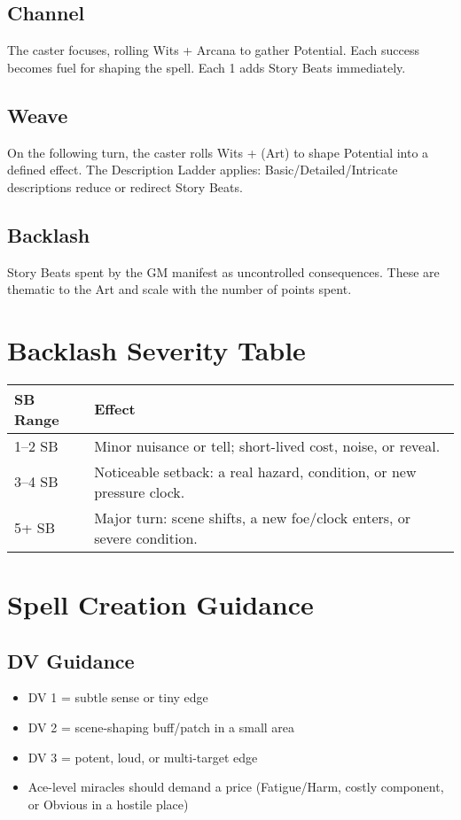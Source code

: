 \documentclass[11pt]{report}
\begin{document}
\subsection{Channel}
The caster focuses, rolling Wits + Arcana to gather Potential. Each success becomes fuel for shaping the spell. Each 1 adds Story Beats immediately.

\subsection{Weave}
On the following turn, the caster rolls Wits + (Art) to shape Potential into a defined effect. The Description Ladder applies: Basic/Detailed/Intricate descriptions reduce or redirect Story Beats.

\subsection{Backlash}
Story Beats spent by the GM manifest as uncontrolled consequences. These are thematic to the Art and scale with the number of points spent.

\section{Backlash Severity Table}

\begin{tabular}{|m{1in}|m{4in}|}
\hline
\textbf{SB Range} & \textbf{Effect} \\
\hline
1–2 SB & Minor nuisance or tell; short-lived cost, noise, or reveal. \\
\hline
3–4 SB & Noticeable setback: a real hazard, condition, or new pressure clock. \\
\hline
5+ SB & Major turn: scene shifts, a new foe/clock enters, or severe condition. \\
\hline
\end{tabular}

\section{Spell Creation Guidance}

\subsection{DV Guidance}
\begin{itemize}
    \item DV 1 = subtle sense or tiny edge
    \item DV 2 = scene-shaping buff/patch in a small area
    \item DV 3 = potent, loud, or multi-target edge
    \item Ace-level miracles should demand a price (Fatigue/Harm, costly component, or Obvious in a hostile place)
\end{itemize}
\end{document}
